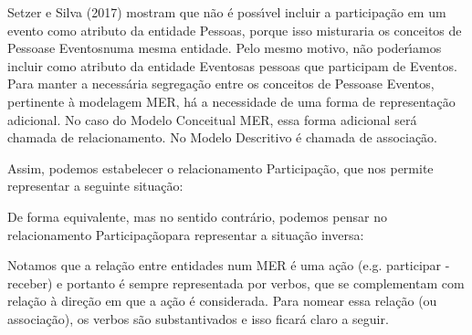 \documentclass[
12pt,		%
openright,	%
twoside,  %
a4paper,			%
chapter=TITLE,		%
english,			%
french,				%
spanish,			%
brazil				%
]{USPSC-classe/USPSC}
\begin{document}
Setzer e Silva (2017) mostram que n\~ao \'e poss\'{\i}vel incluir a participa\c{c}\~ao em um evento como atributo da entidade \textquotedbl Pessoas\textquotedbl , porque isso misturaria os conceitos de \textquotedbl Pessoas\textquotedbl  e \textquotedbl Eventos\textquotedbl  numa mesma entidade. Pelo mesmo motivo, n\~ao poder\'{\i}amos incluir como atributo da entidade \textquotedbl Eventos\textquotedbl  as  pessoas que participam de \textquotedbl Eventos\textquotedbl . Para manter a necess\'aria segrega\c{c}\~ao entre os conceitos de \textquotedbl Pessoas\textquotedbl  e \textquotedbl Eventos\textquotedbl , pertinente \`a modelagem MER, h\'a a necessidade de uma forma de representa\c{c}\~ao adicional. No caso do Modelo Conceitual MER, essa forma adicional ser\'a chamada de \textquotedbl relacionamento\textquotedbl . No Modelo Descritivo \'e chamada de \textquotedbl associa\c{c}\~ao\textquotedbl .










Assim, podemos estabelecer o relacionamento \textquotedbl Participa\c{c}\~ao\textquotedbl , que nos permite representar a seguinte situa\c{c}\~ao:











\noindent\begin{center}\mbox{\centering{}}\end{center}


De forma equivalente, mas no sentido contr\'ario, podemos pensar no  relacionamento \textquotedbl Participa\c{c}\~ao\textquotedbl  para representar a situa\c{c}\~ao inversa:











\noindent\begin{center}\mbox{\centering{}}\end{center}


Notamos que a rela\c{c}\~ao entre entidades num MER \'e uma a\c{c}\~ao (e.g. participar - receber) e portanto \'e sempre representada por verbos, que se complementam com rela\c{c}\~ao \`a dire\c{c}\~ao em que a a\c{c}\~ao \'e considerada. Para nomear essa rela\c{c}\~ao (ou associa\c{c}\~ao), os verbos s\~ao substantivados e isso ficar\'a claro a seguir.
\end{document}
